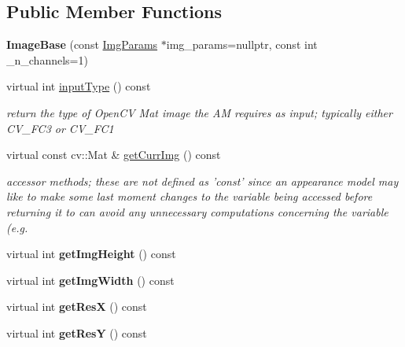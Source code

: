 \subsection*{Public Member Functions}
\begin{DoxyCompactItemize}
\item 
\hypertarget{classImageBase_a44574be90999ffd0c7a9d700608005db}{{\bfseries Image\-Base} (const \hyperlink{structImgParams}{Img\-Params} $\ast$img\-\_\-params=nullptr, const int \-\_\-n\-\_\-channels=1)}\label{classImageBase_a44574be90999ffd0c7a9d700608005db}

\item 
\hypertarget{classImageBase_afc86a63579a95bf7ee05aff4c1f21522}{virtual int \hyperlink{classImageBase_afc86a63579a95bf7ee05aff4c1f21522}{input\-Type} () const }\label{classImageBase_afc86a63579a95bf7ee05aff4c1f21522}

\begin{DoxyCompactList}\small\item\em return the type of Open\-C\-V Mat image the A\-M requires as input; typically either C\-V\-\_\-F\-C3 or C\-V\-\_\-F\-C1 \end{DoxyCompactList}\item 
virtual const cv\-::\-Mat \& \hyperlink{classImageBase_aeab7b6efa7fa9c98bec6e20594113bf0}{get\-Curr\-Img} () const 
\begin{DoxyCompactList}\small\item\em accessor methods; these are not defined as 'const' since an appearance model may like to make some last moment changes to the variable being accessed before returning it to can avoid any unnecessary computations concerning the variable (e.\-g. \end{DoxyCompactList}\item 
\hypertarget{classImageBase_aa28aca0398cdecce95ad382665363938}{virtual int {\bfseries get\-Img\-Height} () const }\label{classImageBase_aa28aca0398cdecce95ad382665363938}

\item 
\hypertarget{classImageBase_a250f19163c9fe65ba2a4f137ce2bf90b}{virtual int {\bfseries get\-Img\-Width} () const }\label{classImageBase_a250f19163c9fe65ba2a4f137ce2bf90b}

\item 
\hypertarget{classImageBase_afe923eb9b81d60f333e2dfe0131bdd20}{virtual int {\bfseries get\-Res\-X} () const }\label{classImageBase_afe923eb9b81d60f333e2dfe0131bdd20}

\item 
\hypertarget{classImageBase_a2017f3faf5fe85d6cc26e471041c45ee}{virtual int {\bfseries get\-Res\-Y} () const }\label{classImageBase_a2017f3faf5fe85d6cc26e471041c45ee}


\end{DoxyCompactItemize}
